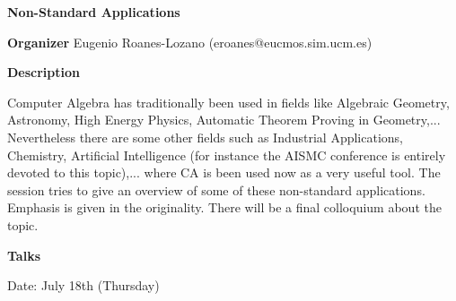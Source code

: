\begin{center}
{\LARGE \bf Non-Standard Applications
}
\end{center}
\bigskip

{\bf Organizer}
Eugenio Roanes-Lozano (eroanes@eucmos.sim.ucm.es)

\medskip

\bigskip

{\bf Description}
\medskip

Computer Algebra has traditionally been used in fields like Algebraic Geometry, Astronomy,
High Energy Physics, Automatic Theorem Proving in Geometry,... Nevertheless there are some
other fields such as Industrial Applications, Chemistry, Artificial Intelligence (for instance the
AISMC conference is entirely devoted to this topic),... where CA is been used now as a very useful
tool. The session tries to give an overview of some of these non-standard applications. Emphasis is
given in the originality. There will be a final colloquium about the topic. 

\bigskip
{\bf Talks}
\medskip

Date: July 18th (Thursday) 

